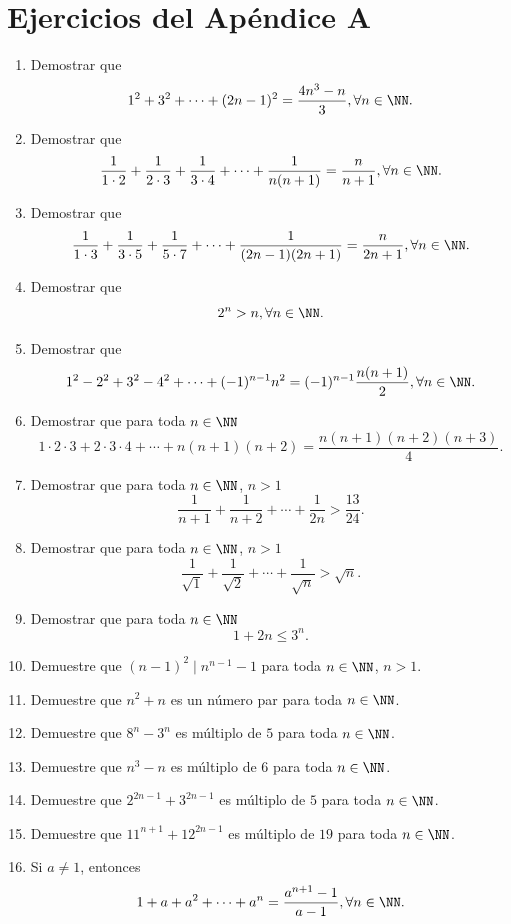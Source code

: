 \newpage

\section{Ejercicios del Apéndice A}

\begin{enumerate}
    \item Demostrar que
    $$1^2+3^2+\cdots +(2n-1)^2=\frac{4n^3-n}{3}, \forall n \in \NN.$$
    \item Demostrar que
    $$\frac{1}{1\cdot 2}+\frac{1}{2\cdot 3}+\frac{1}{3\cdot 4}+\cdots +\frac{1}{n(n+1)}=\frac{n}{n+1}, \forall n \in \NN.$$
    \item Demostrar que
    $$\frac{1}{1\cdot 3}+\frac{1}{3\cdot 5}+\frac{1}{5\cdot 7}+\cdots +\frac{1}{(2n-1)(2n+1)}=\frac{n}{2n+1}, \forall n \in \NN.$$
    \item Demostrar que
    $$2^n>n, \forall n \in \NN.$$
    \item Demostrar que
    $$1^2-2^2+3^2-4^2+\cdots +(-1)^{n-1}n^2=(-1)^{n-1} \frac{n(n+1)}{2}, \forall n \in \NN.$$
    \item Demostrar que para toda $n \in \NN$
    $$1 \cdot 2 \cdot 3 + 2\cdot 3 \cdot 4 + \cdots + n(n+1)(n+2) = \frac{n(n+1)(n+2)(n+3)}{4}.$$
    \item Demostrar que para toda $n \in \NN$, $n>1$
    $$\frac{1}{n+1}+\frac{1}{n+2}+\cdots +\frac{1}{2n}>\frac{13}{24}.$$
    \item Demostrar que para toda $n \in \NN$, $n>1$
    $$\frac{1}{\sqrt{1}}+\frac{1}{\sqrt{2}}+\cdots +\frac{1}{\sqrt{n}}>\sqrt{n}.$$
    \item Demostrar que para toda $n \in \NN$
    $$1+2n \leq 3^n.$$
    \item Demuestre que $(n-1)^2 \mid n^{n-1}-1$ para toda $n \in \NN$, $n>1$.
    \item Demuestre que $n^2+n$ es un número par para toda $n \in \NN$.
    \item Demuestre que $8^n-3^n$ es múltiplo de $5$ para toda $n \in \NN$.
    \item Demuestre que $n^3-n$ es múltiplo de $6$ para toda $n \in \NN$.
    \item Demuestre que $2^{2n-1}+3^{2n-1}$ es múltiplo de $5$ para toda $n \in \NN$.
    \item Demuestre que $11^{n+1}+12^{2n-1}$ es múltiplo de $19$ para toda $n \in \NN$.
    \item Si $a \neq 1$, entonces
    $$1+a+a^2+\cdots +a^n=\frac{a^{n+1}-1}{a-1}, \forall n \in \NN.$$

\end{enumerate}
